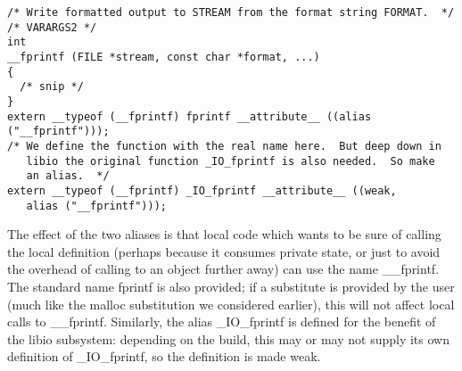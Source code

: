 {\scriptsize\begin{lstlisting}
/* Write formatted output to STREAM from the format string FORMAT.  */
/* VARARGS2 */
int
__fprintf (FILE *stream, const char *format, ...)
{
  /* snip */
}
extern __typeof (__fprintf) fprintf __attribute__ ((alias ("__fprintf")));
/* We define the function with the real name here.  But deep down in
   libio the original function _IO_fprintf is also needed.  So make
   an alias.  */
extern __typeof (__fprintf) _IO_fprintf __attribute__ ((weak, 
   alias ("__fprintf")));
\end{lstlisting}}

The effect of the two aliases is that
local code which wants to be sure of calling the local definition
(perhaps because it consumes private state, or just to avoid the overhead 
of calling to an object further away) 
can use the name \textsf{\_\_fprintf}.
The standard name \textsf{fprintf} is also provided;
if a substitute is provided by the user 
(much like the \textsf{malloc} substitution we considered earlier),
this will not affect local calls to \textsf{\_\_fprintf}.
Similarly, the alias \textsf{\_IO\_fprintf} is defined
for the benefit of the \textsf{libio} subsystem: 
depending on the build,
this may or may not supply its own definition of \textsf{\_IO\_fprintf},
so the definition is made weak.

% 
% 
% 
% 
% 
% 

